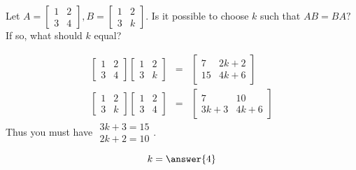 \documentclass{ximera}
\begin{document}
\begin{problem}\label{prb:4.14} Let $A=\left[
\begin{array}{rr}
1 & 2 \\
3 & 4
\end{array}
\right] ,B=\left[
\begin{array}{rr}
1 & 2 \\
3 & k
\end{array}
\right] .$ Is it possible to choose $k$ such that $AB=BA?$ If so, what
should $k$ equal?

\begin{hint}
\begin{eqnarray*}
\left[
\begin{array}{cc}
1 & 2 \\
3 & 4
\end{array}
\right] \left[
\begin{array}{cc}
1 & 2 \\
3 & k
\end{array}
\right] &=& \left[
\begin{array}{cc}
7 & 2k+2 \\
15 & 4k+6
\end{array}
\right] \\
 \left[
\begin{array}{cc}
1 & 2 \\
3 & k
\end{array}
\right] \left[
\begin{array}{cc}
1 & 2 \\
3 & 4
\end{array}
\right] &=& \left[
\begin{array}{cc}
7 & 10 \\
3k+3 & 4k+6
\end{array}
\right]
\end{eqnarray*}
 Thus you must have $
\begin{array}{c}
3k+3=15 \\
2k+2=10
\end{array}
$.
\end{hint}

$$k=\answer{4}$$
\end{problem}
\end{document}
